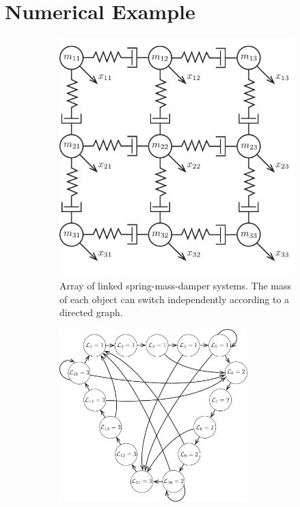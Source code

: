 \section{Numerical Example}
\begin{figure}
	\centering
	\begin{subfigure}[c]{0.475\columnwidth}%
		\centering
		\includegraphics[width=\textwidth]{./figures/num_ex_sys}%
		\caption{Array of linked spring-mass-damper systems. The mass of each object can switch independently according to a directed graph.}%
		\label{fig:num_ex_sys}%
	\end{subfigure}%
	\hfill
	\begin{subfigure}[c]{0.475\columnwidth}%
		\centering
		\includegraphics[width=0.8\textwidth]{./figures/num_ex_graph}%

\end{subfigure}
\end{figure}
